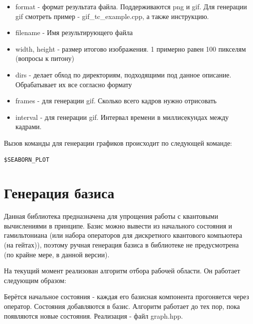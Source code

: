 \documentclass[12pt,fleqn]{article}
\begin{document}
        \begin{itemize}
            \item{format - формат результата файла. Поддерживаются png и gif. Для генерации gif смотреть пример - \textsf{gif\_tc\_example.cpp}, а также инструкцию.}
            \item{filename - Имя результирующего файла}
            \item{width, height - размер итогово изображения. 1 примерно равен 100 пикселям (вопросы к питону)}
            \item{dirs - делает обход по директориям, подходящими под данное описание. Обрабатывает их все согласно формату}
            \item{frames - для генерации gif. Сколько всего кадров нужно отрисовать}
            \item{interval - для генерации gif. Интервал времени в миллисекундах между кадрами.}
        \end{itemize}


        Вызов команды для генерации графиков происходит по следующей команде:

\begin{mdframed}[linecolor=black, topline=true, bottomline=true,
leftline=false, rightline=false]
\begin{verbatim}
$SEABORN_PLOT
\end{verbatim}
\end{mdframed}

        \section{Генерация базиса}

        Данная библиотека предназначена для упрощения работы с квантовыми вычислениями в принципе. Базис можно вывести из начального состояния и гамильтониана (или набора операторов для дискретного
        квантового компьютера (на гейтах)), поэтому ручная генерация базиса в библиотеке не предусмотрена (по крайне мере, в данной версии).

        На текущий момент реализован \textsf{алгоритм отбора рабочей области}. Он работает следующим образом:

        Берётся начальное состояния - каждая его базисная компонента прогоняется через оператор. Состояния добавляются в базис.
        Алгоритм работает до тех пор, пока появляются новые состояния. Реализация - файл \textsf{graph.hpp}.
\end{document}
